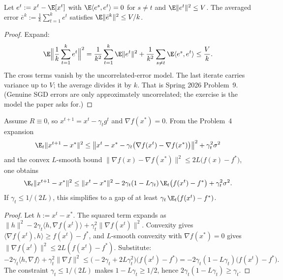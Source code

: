\begin{proposition}
\label{prop:optu-avg-var}
Let $e^t:=x^t-\E[x^t]$ with $\E\langle e^s,e^t\rangle=0$ for $s\neq t$ and $\E\|e^t\|^2\le V$. The averaged error $\bar e^k:=\frac1k\sum_{t=1}^k e^t$ satisfies $\E\|\bar e^k\|^2\le V/k$.
\end{proposition}

\begin{proof}
Expand:
\[
\E\Bigl\|\frac1k\sum_{t=1}^k e^t\Bigr\|^2
=
\frac1{k^2}\sum_{t=1}^k\E\|e^t\|^2
+
\frac1{k^2}\sum_{s\neq t}\E\langle e^s,e^t\rangle
\le
\frac{V}k.
\]
The cross terms vanish by the uncorrelated-error model. The last iterate carries variance up to $V$; the average divides it by $k$. That is Spring 2026 Problem~9. (Genuine SGD errors are only approximately uncorrelated; the exercise is the model the paper asks for.)
\end{proof}

\begin{proposition}
\label{prop:optu-gap}
Assume $R\equiv 0$, so $x^{t+1}=x^t-\gamma_t g^t$ and $\nabla f(x^*)=0$. From the Problem~4 expansion
\[
\E_t\|x^{t+1}-x^*\|^2
\le
\bigl\|x^t-x^*-\gamma_t\bigl(\nabla f(x^t)-\nabla f(x^*)\bigr)\bigr\|^2
+\gamma_t^2\sigma^2
\]
and the convex $L$-smooth bound $\|\nabla f(x)-\nabla f(x^*)\|^2\le 2L\bigl(f(x)-f^*\bigr)$, one obtains
\[
\E_t\|x^{t+1}-x^*\|^2
\le
\|x^t-x^*\|^2-2\gamma_t(1-L\gamma_t)\,\E_t\bigl(f(x^t)-f^*\bigr)+\gamma_t^2\sigma^2.
\]
If $\gamma_t\le 1/(2L)$, this simplifies to a gap of at least $\gamma_t\,\E_t(f(x^t)-f^*)$.
\end{proposition}

\begin{proof}
Let $h:=x^t-x^*$. The squared term expands as $\|h\|^2-2\gamma_t\langle h,\nabla f(x^t)\rangle+\gamma_t^2\|\nabla f(x^t)\|^2$. Convexity gives $\langle\nabla f(x^t),h\rangle\ge f(x^t)-f^*$, and $L$-smooth convexity with $\nabla f(x^*)=0$ gives $\|\nabla f(x^t)\|^2\le 2L(f(x^t)-f^*)$. Substitute:
\[
-2\gamma_t\langle h,\nabla f\rangle+\gamma_t^2\|\nabla f\|^2
\le
\bigl(-2\gamma_t+2L\gamma_t^2\bigr)\bigl(f(x^t)-f^*\bigr)
=
-2\gamma_t(1-L\gamma_t)\bigl(f(x^t)-f^*\bigr).
\]
The constraint $\gamma_t\le 1/(2L)$ makes $1-L\gamma_t\ge 1/2$, hence $2\gamma_t(1-L\gamma_t)\ge\gamma_t$.
\end{proof}

